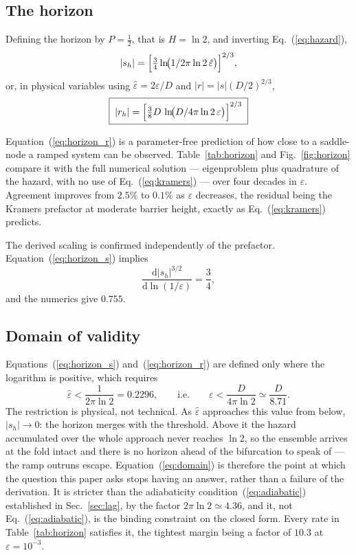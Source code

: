 \documentclass[%
 twocolumn,
 superscriptaddress,
 amsmath,amssymb,
 aps,
 pre,
 floatfix,
]{revtex4-2}
\newcommand{\dd}{\mathrm{d}}
\newcommand{\Sig}{\hat\varepsilon}
\begin{document}
\subsection{The horizon}

Defining the horizon by $P=\tfrac12$, that is $H=\ln2$, and inverting Eq.~(\ref{eq:hazard}),
\begin{equation}
\label{eq:horizon_s}
|s_h|=\Bigl[\tfrac34\ln\!\bigl(1/2\pi\ln2\,\Sig\bigr)\Bigr]^{2/3},
\end{equation}
or, in physical variables using $\Sig=2\varepsilon/D$ and $|r|=|s|(D/2)^{2/3}$,
\begin{equation}
\label{eq:horizon_r}
\boxed{\;|r_h|=\Bigl[\tfrac38 D\,\ln\!\bigl(D/4\pi\ln2\,\varepsilon\bigr)\Bigr]^{2/3}\;}
\end{equation}

Equation~(\ref{eq:horizon_r}) is a parameter-free prediction of how close to a saddle-node a ramped system can be observed.  Table~\ref{tab:horizon} and Fig.~\ref{fig:horizon} compare it with the full numerical solution --- eigenproblem plus quadrature of the hazard, with no use of Eq.~(\ref{eq:kramers}) --- over four decades in $\varepsilon$.  Agreement improves from $2.5\%$ to $0.1\%$ as $\varepsilon$ decreases, the residual being the Kramers prefactor at moderate barrier height, exactly as Eq.~(\ref{eq:kramers}) predicts.

The derived scaling is confirmed independently of the prefactor.  Equation~(\ref{eq:horizon_s}) implies
\begin{equation}
\label{eq:exponent}
\frac{\dd|s_h|^{3/2}}{\dd\ln(1/\varepsilon)}=\frac34 ,
\end{equation}
and the numerics give $0.755$.

\subsection{\label{sec:domain}Domain of validity}

Equations~(\ref{eq:horizon_s}) and~(\ref{eq:horizon_r}) are defined only where the logarithm is positive, which requires
\begin{equation}
\label{eq:domain}
\Sig<\frac{1}{2\pi\ln2}=0.2296,
\qquad\text{i.e.}\qquad
\varepsilon<\frac{D}{4\pi\ln2}\simeq\frac{D}{8.71}.
\end{equation}
The restriction is physical, not technical.  As $\Sig$ approaches this value from below, $|s_h|\to0$: the horizon merges with the threshold.  Above it the hazard accumulated over the whole approach never reaches $\ln2$, so the ensemble arrives at the fold intact and there is no horizon ahead of the bifurcation to speak of --- the ramp outruns escape.  Equation~(\ref{eq:domain}) is therefore the point at which the question this paper asks stops having an answer, rather than a failure of the derivation.  It is stricter than the adiabaticity condition~(\ref{eq:adiabatic}) established in Sec.~\ref{sec:lag}, by the factor $2\pi\ln2\simeq4.36$, and it, not Eq.~(\ref{eq:adiabatic}), is the binding constraint on the closed form.  Every rate in Table~\ref{tab:horizon} satisfies it, the tightest margin being a factor of $10.3$ at $\varepsilon=10^{-3}$.
\end{document}
